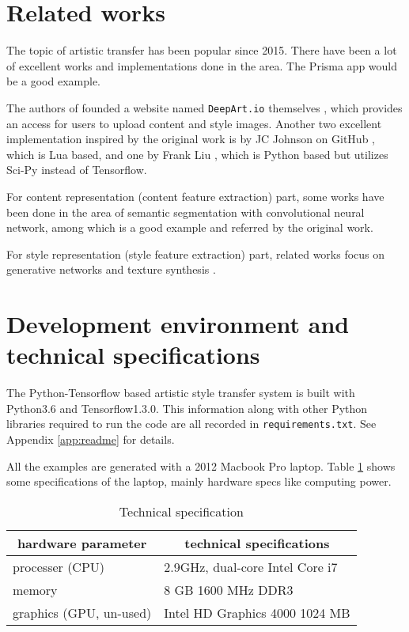 
\section{Related works}
\label{sec:intro:related}

The topic of artistic transfer has been popular since 2015.
There have been a lot of excellent works and implementations done in the area.
The Prisma app would be a good example.

The authors of \cite{Gatys:2016gj} founded a website named
\texttt{DeepArt.io} themselves \cite{wiki:deepart},
which provides an access for users to upload content and style images.
Another two excellent implementation inspired by the original work
is by JC Johnson on GitHub \cite{Johnson2015}, which is Lua based,
and one by Frank Liu \cite{Liu2017}, which is Python based but
utilizes Sci-Py instead of Tensorflow.

For content representation (content feature extraction) part,
some works have been done in the area of semantic segmentation with convolutional neural network,
among which \cite{Long:2014um} is a good example and referred by the original work.

For style representation (style feature extraction) part,
related works focus on generative networks and texture synthesis \cite{gatys2015texture, Ulyanov:2016tw}.



\section{Development environment and technical specifications}
\label{sec:intro:spec}

The Python-Tensorflow based artistic style transfer system
is built with Python3.6 and Tensorflow1.3.0.
This information along with other Python libraries required to run the code
are all recorded in \texttt{requirements.txt}.
See Appendix \ref{app:readme} for details.

All the examples are generated with a 2012 Macbook Pro laptop.
Table \ref{table:spec} shows some specifications of the laptop,
mainly hardware specs like computing power.

    \begin{table}[!htb]
    \center
    \begin{tabular}{l|l}
    \hline
    \multicolumn{1}{c|}{hardware parameter} & \multicolumn{1}{c}{technical specifications} \\ \hline
    processer (CPU) & 2.9GHz, dual-core Intel Core i7 \\
    memory & 8 GB 1600 MHz DDR3 \\
    graphics (GPU, un-used) & Intel HD Graphics 4000 1024 MB \\
    \hline
    \end{tabular}
    \caption{Technical specification}
    \label{table:spec}
    \end{table}
